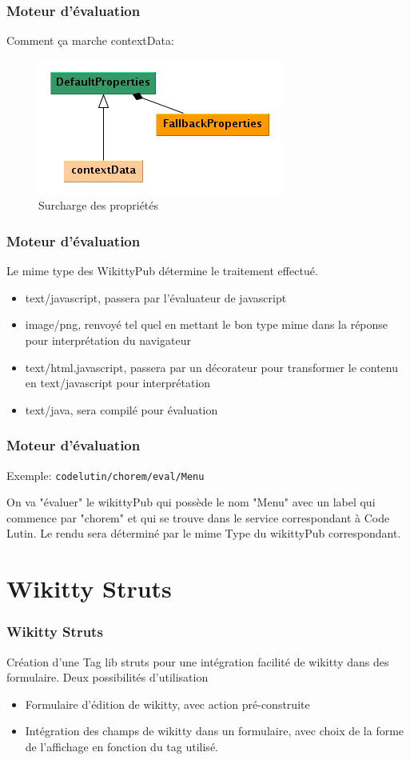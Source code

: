 \documentclass[12pt,a4paper,utf8x]{beamer}
\begin{document}
\begin{frame}\frametitle{Moteur d'évaluation}

Comment ça marche contextData:

\begin{figure}
\includegraphics[scale=0.5]{../image/propertiescontext.png} 
\caption{Surcharge des propriétés}
\end{figure}

\end{frame}

\begin{frame}\frametitle{Moteur d'évaluation}
Le mime type des WikittyPub détermine le traitement effectué.
\begin{itemize}
\item text/javascript, passera par l'évaluateur de javascript
\item image/png, renvoyé tel quel en mettant le bon type mime dans la réponse 
pour interprétation du navigateur
\item text/html.javascript, passera par un décorateur pour transformer le contenu
en text/javascript pour interprétation
\item text/java, sera compilé pour évaluation
\end{itemize}
\end{frame}

\begin{frame}\frametitle{Moteur d'évaluation}

Exemple:
\verb!codelutin/chorem/eval/Menu! 

On va "évaluer" le wikittyPub qui possède le nom "Menu" avec un label qui
commence par "chorem" et qui se trouve dans le service correspondant à Code Lutin.
Le rendu sera déterminé par le mime Type du wikittyPub correspondant.
\end{frame}





\section{Wikitty Struts} 
\begin{frame}\frametitle{Wikitty Struts}
Création d'une Tag lib struts pour une intégration facilité de wikitty dans des 
formulaire.
Deux possibilités d'utilisation
\begin{itemize}
\item Formulaire d'édition de wikitty, avec action pré-construite 
\item Intégration des champs de wikitty dans un formulaire, avec choix de la forme
de l'affichage en fonction du tag utilisé.
\end{itemize}

\end{frame}
\end{document}
